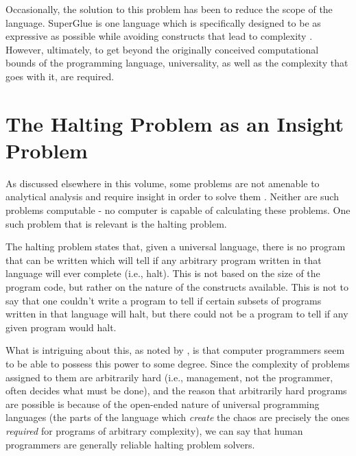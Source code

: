 Occasionally, the solution to this problem has been to reduce the scope of the language.  SuperGlue is one language which is specifically designed to be as expressive as possible while avoiding constructs that lead to complexity \citep{mcdirmid}.  However, ultimately, to get beyond the originally conceived computational bounds of the programming language, universality, as well as the complexity that goes with it, are required.

\section{The Halting Problem as an Insight Problem}

As discussed elsewhere in this volume, some problems are not amenable to analytical analysis and require insight in order to solve them \citep{bartlett1, holloway}.  Neither are such problems computable - no computer is capable of calculating these problems.  One such problem that is relevant is the halting problem.

The halting problem states that, given a universal language, there is no program that can be written which will tell if any arbitrary program written in that language will ever complete (i.e., halt).  This is not based on the size of the program code, but rather on the nature of the constructs available.  This is not to say that one couldn't write a program to tell if certain subsets of programs written in that language will halt, but there could not be a program to tell if any given program would halt.

What is intriguing about this, as noted by \citet{bartlett1}, is that computer programmers seem to be able to possess this power to some degree.  Since the complexity of problems assigned to them are arbitrarily hard (i.e., management, not the programmer, often decides what must be done), and the reason that arbitrarily hard programs are possible is because of the open-ended nature of universal programming languages (the parts of the language which \textit{create} the chaos are precisely the ones \textit{required} for programs of arbitrary complexity), we can say that human programmers are generally reliable halting problem solvers.

